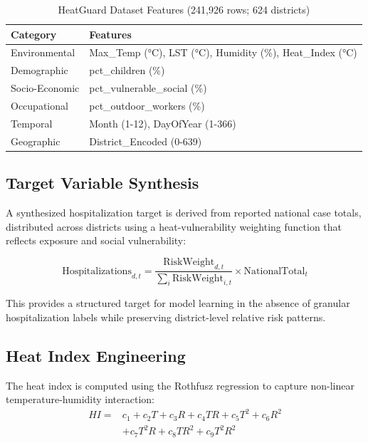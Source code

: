 \documentclass[conference]{IEEEtran}
\begin{document}
\begin{table}[htbp]
\centering
\caption{HeatGuard Dataset Features (241,926 rows; 624 districts)}
\begin{tabular}{@{}l p{5.2cm} @{} }
\toprule
\textbf{Category} & \textbf{Features} \\
\midrule
Environmental & Max\_Temp (°C), LST (°C), Humidity (\%), Heat\_Index (°C) \\
Demographic & pct\_children (\%) \\
Socio-Economic & pct\_vulnerable\_social (\%) \\
Occupational & pct\_outdoor\_workers (\%) \\
Temporal & Month (1-12), DayOfYear (1-366) \\
Geographic & District\_Encoded (0-639) \\
\bottomrule
\end{tabular}
\label{tab:features}
\end{table}

\subsection{Target Variable Synthesis}
A synthesized hospitalization target is derived from reported national case totals, distributed across districts using a heat-vulnerability weighting function that reflects exposure and social vulnerability:

\begin{equation}
\text{Hospitalizations}_{d,t} = \frac{\text{RiskWeight}_{d,t}}{\sum_{i} \text{RiskWeight}_{i,t}} \times \text{NationalTotal}_{t}
\end{equation}

This provides a structured target for model learning in the absence of granular hospitalization labels while preserving district-level relative risk patterns.

\subsection{Heat Index Engineering}
The heat index is computed using the Rothfusz regression to capture non-linear temperature-humidity interaction:
\begin{equation}
\begin{aligned}
HI = & c_1 + c_2T + c_3R + c_4TR + c_5T^2 + c_6R^2 \\
& + c_7T^2R + c_8TR^2 + c_9T^2R^2
\end{aligned}
\label{eq:heatindex}
\end{equation}
\end{document}
